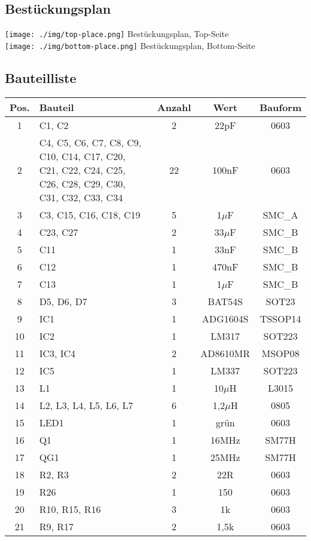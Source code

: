\subsection{Bestückungsplan}
\begin{center}
\texttt{[image: ./img/top-place.png]}
Bestückungsplan, Top-Seite
\bigskip \\
\texttt{[image: ./img/bottom-place.png]}
Bestückungsplan, Bottom-Seite
\pagebreak
\subsection{Bauteilliste}
\begin{tabular}{|c|p{5cm}|c|c|c|}
\hline
Pos. & Bauteil & Anzahl & Wert & Bauform \\ \hline
1 & C1, C2 &2 & 22pF & 0603 \\ \hline
2 & C4, C5, C6, C7, C8, C9, C10, C14, C17, C20, C21, C22, C24, C25, C26, C28, C29, C30, C31, C32, C33, C34 & 22 & 100nF & 0603 \\ \hline
3 & C3, C15, C16, C18, C19 & 5 & 1$\mu$F & SMC\_A \\ \hline
4 & C23, C27 & 2 & 33$\mu$F & SMC\_B \\ \hline
5 & C11 & 1 & 33nF & SMC\_B \\ \hline
6 & C12 & 1 & 470nF & SMC\_B \\ \hline
7 & C13 & 1 & 1$\mu$F & SMC\_B \\ \hline
8 & D5, D6, D7 & 3 & BAT54S & SOT23 \\ \hline
9 & IC1 & 1 & ADG1604S & TSSOP14 \\ \hline
10 & IC2 & 1 & LM317 & SOT223  \\ \hline
11 & IC3, IC4 & 2 & AD8610MR & MSOP08  \\ \hline
12 & IC5 & 1 & LM337 & SOT223  \\ \hline
13 & L1 & 1 & 10$\mu$H & L3015 \\ \hline
14 & L2, L3, L4, L5, L6, L7 & 6 & 1,2$\mu$H & 0805 \\ \hline
15 & LED1 & 1 & grün & 0603 \\ \hline
16 & Q1 & 1 & 16MHz & SM77H \\ \hline
17 & QG1 & 1 & 25MHz & SM77H \\ \hline
18 & R2, R3 & 2 & 22R & 0603 \\ \hline
19 & R26 & 1 & 150  & 0603 \\ \hline
20 & R10, R15, R16 & 3 & 1k & 0603 \\ \hline
21 & R9, R17 & 2 & 1,5k & 0603 \\ \hline

\end{tabular}
\end{center}

